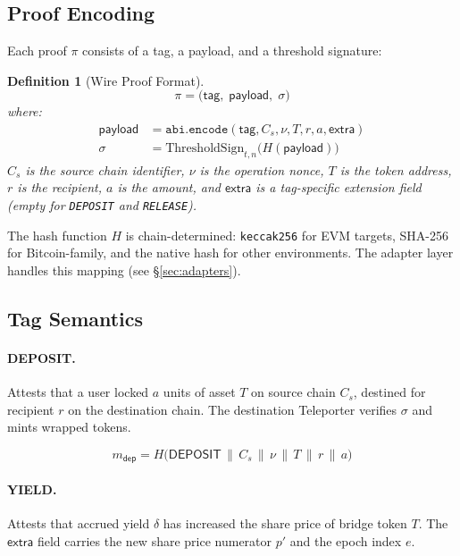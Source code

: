 \documentclass[11pt]{article}
\newtheorem{definition}{Definition}
\begin{document}
\subsection{Proof Encoding}

Each proof $\pi$ consists of a tag, a payload, and a threshold signature:

\begin{definition}[Wire Proof Format]
\label{def:proof}
\begin{equation}
  \pi = \bigl(\mathsf{tag},\; \mathsf{payload},\; \sigma\bigr)
\end{equation}
where:
\begin{align}
  \mathsf{payload} &= \texttt{abi.encode}(\mathsf{tag}, C_s, \nu, T, r, a, \mathsf{extra}) \\
  \sigma &= \mathrm{ThresholdSign}_{t,n}\bigl(H(\mathsf{payload})\bigr)
\end{align}
$C_s$ is the source chain identifier, $\nu$ is the operation nonce, $T$ is the token address, $r$ is the recipient, $a$ is the amount, and $\mathsf{extra}$ is a tag-specific extension field (empty for \texttt{DEPOSIT} and \texttt{RELEASE}).
\end{definition}

The hash function $H$ is chain-determined: \texttt{keccak256} for EVM targets, SHA-256 for Bitcoin-family, and the native hash for other environments. The adapter layer handles this mapping (see \S\ref{sec:adapters}).

\subsection{Tag Semantics}

\paragraph{DEPOSIT.} Attests that a user locked $a$ units of asset $T$ on source chain $C_s$, destined for recipient $r$ on the destination chain. The destination Teleporter verifies $\sigma$ and mints wrapped tokens.

\begin{equation}
  m_{\mathsf{dep}} = H\bigl(\mathsf{DEPOSIT} \,\|\, C_s \,\|\, \nu \,\|\, T \,\|\, r \,\|\, a\bigr)
  \label{eq:deposit}
\end{equation}

\paragraph{YIELD.} Attests that accrued yield $\delta$ has increased the share price of bridge token $T$. The $\mathsf{extra}$ field carries the new share price numerator $p'$ and the epoch index $e$.
\end{document}
